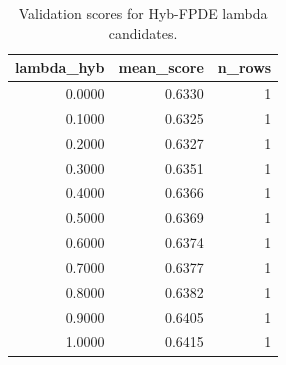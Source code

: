 \begin{table}[t]
\caption{Validation scores for Hyb-FPDE lambda candidates.}
\label{tab:lambda_distribution_computed}
\centering
\begin{tabular}{rrr}
\toprule
lambda\_hyb & mean\_score & n\_rows \\
\midrule
0.0000 & 0.6330 & 1 \\
0.1000 & 0.6325 & 1 \\
0.2000 & 0.6327 & 1 \\
0.3000 & 0.6351 & 1 \\
0.4000 & 0.6366 & 1 \\
0.5000 & 0.6369 & 1 \\
0.6000 & 0.6374 & 1 \\
0.7000 & 0.6377 & 1 \\
0.8000 & 0.6382 & 1 \\
0.9000 & 0.6405 & 1 \\
1.0000 & 0.6415 & 1 \\
\bottomrule
\end{tabular}

\end{table}
